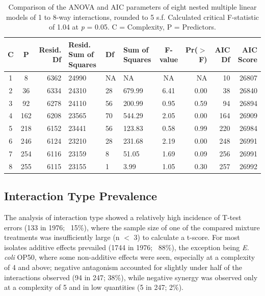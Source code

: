 \documentclass[10pt]{article}
\begin{document}
\begin{table}[ht]
\centering
\small
\addtolength{\tabcolsep}{-3pt}
\caption{Comparison of the ANOVA and AIC parameters of eight nested multiple linear models of 1 to 8-way interactions, rounded to 5 s.f. Calculated critical F-statistic of 1.04 at \textit{p} = 0.05. C = Complexity, P = Predictors.}
\begin{tabular}{c c N P O P c N N N}
\toprule 
\textbf{C} & \textbf{P} & \textbf{Resid. Df} & \textbf{Resid. Sum of Squares} & \textbf{Df} & \textbf{Sum of Squares} & \textbf{F-value} & \textbf{Pr($>$F)} & \textbf{AIC Df} & \textbf{AIC Score} \\
\midrule
{}   1 & 8   & 6362 & 24990 & NA  & NA        & NA   & NA   & 10  & 26807 \\
                    2 & 36  & 6334 & 24310 & 28  & 679.99    & 6.41 & 0.00 & 38  & 26840 \\
   3 & 92  & 6278 & 24110 & 56  & 200.99    & 0.95 & 0.59 & 94  & 26894 \\
                    4 & 162 & 6208 & 23565 & 70  & 544.29    & 2.05 & 0.00 & 164 & 26909 \\
   5 & 218 & 6152 & 23441 & 56  & 123.83    & 0.58 & 0.99 & 220 & 26984 \\
                    6 & 246 & 6124 & 23210 & 28  & 231.68    & 2.19 & 0.00 & 248 & 26991 \\
   7 & 254 & 6116 & 23159 & 8   & 51.05     & 1.69 & 0.09 & 256 & 26991 \\
                    8 & 255 & 6115 & 23155 & 1   & 3.99      & 1.05 & 0.30 & 257 & 26992 \\     
\bottomrule
\end{tabular}
\label{tab:lmodels}
\end{table}

\newpage
\subsection{Interaction Type Prevalence}
\label{S:3:7}

The analysis of interaction type showed a relatively high incidence of T-test errors (133 in 1976; ~15\%), where the sample size of one of the compared mixture treatments was insufficiently large (n $<$ 3) to calculate a t-score. For most isolates additive effects prevailed (1744 in 1976; ~88\%), the exception being \textit{E. coli} OP50, where some non-additive effects were seen, especially at a complexity of 4 and above; negative antagonism accounted for slightly under half of the interactions observed (94 in 247; 38\%), while negative synergy was observed only at a complexity of 5 and in low quantities (5 in 247; 2\%).
\end{document}
